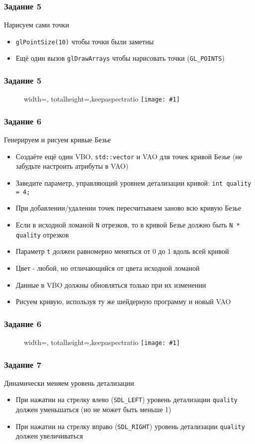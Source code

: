 \documentclass{beamer}
\newcommand{\slideimage}[1]{
  \begin{figure}
    \begin{adjustbox}{width=\textwidth, totalheight=\textheight-2\baselineskip-2\baselineskip,keepaspectratio}
      \texttt{[image: \#1]}
    \end{adjustbox}
  \end{figure}
}
\begin{document}
\begin{frame}[fragile]
\frametitle{Задание 5}
Нарисуем сами точки
\begin{itemize}
\item \verb|glPointSize(10)| чтобы точки были заметны
\item Ещё один вызов \verb|glDrawArrays| чтобы нарисовать точки (\verb|GL_POINTS|)
\end{itemize}
\end{frame}

\begin{frame}
\frametitle{Задание 5}
\slideimage{5.png}
\end{frame}

\begin{frame}[fragile]
\frametitle{Задание 6}
Генерируем и рисуем кривые Безье
\begin{itemize}
\item Создаёте ещё один VBO, \verb|std::vector| и VAO для точек кривой Безье (не забудьте настроить атрибуты в VAO)
\item Заведите параметр, управляющий уровнем детализации кривой: \verb|int quality = 4;|
\item При добавлении/удалении точек пересчитываем заново всю кривую Безье
\item Если в исходной ломаной \verb|N| отрезков, то в кривой Безье должно быть \verb|N * quality| отрезков
\item Параметр \verb|t| должен равномерно меняться от 0 до 1 вдоль всей кривой
\item Цвет - любой, но отличающийся от цвета исходной ломаной
\item Данные в VBO должны обновляться только при их изменении
\item Рисуем кривую, используя ту же шейдерную программу и новый VAO
\end{itemize}
\end{frame}

\begin{frame}
\frametitle{Задание 6}
\slideimage{6.png}
\end{frame}

\begin{frame}[fragile]
\frametitle{Задание 7}
Динамически меняем уровень детализации
\begin{itemize}
\item При нажатии на стрелку влево (\verb|SDL_LEFT|) уровень детализации \verb|quality| должен уменьшаться (но не может быть меньше 1)
\item При нажатии на стрелку вправо (\verb|SDL_RIGHT|) уровень детализации \verb|quality| должен увеличиваться
\end{itemize}
\end{frame}
\end{document}
